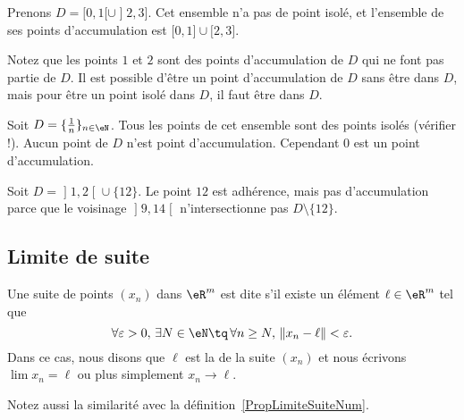 \begin{example}
	Prenons $D=\mathopen[ 0 , 1 [\cup\mathopen] 2 , 3 \mathclose]$. Cet ensemble n'a pas de point isolé, et l'ensemble de ses points d'accumulation est $\mathopen[ 0 , 1 \mathclose]\cup\mathopen[ 2,3  \mathclose]$.

	Notez que les points $1$ et $2$ sont des points d'accumulation de $D$ qui ne font pas partie de $D$. Il est possible d'être un point d'accumulation de $D$ sans être dans $D$, mais pour être un point isolé dans $D$, il faut être dans $D$.
\end{example}

\begin{example}
	Soit $D=\{ \frac{1}{ n }\}_{n\in\eN}$. Tous les points de cet ensemble sont des points isolés (vérifier !).  Aucun point de $D$ n'est point d'accumulation. Cependant $0$ est un point d'accumulation.
\end{example}

\begin{example}     \label{EXooWOYQooJolaTV}
    Soit \( D=\mathopen] 1 , 2 \mathclose[\cup\{ 12 \}\). Le point \( 12\) est adhérence, mais pas d'accumulation parce que le voisinage \( \mathopen] 9 , 14 \mathclose[\) n'intersectionne pas \( D\setminus \{ 12 \}\).
\end{example}

\subsection{Limite de suite}

\begin{definition}
	Une suite de points $(x_n)$ dans $\eR^m$ est dite  s'il existe un élément $\ell\in\eR^m$ tel que
	\begin{equation}	\label{EqCondLimSuite}
		\forall\varepsilon>0,\,\exists N\in \eN\tq\,\forall n\geq N,\,\| x_n-\ell \|<\varepsilon.
	\end{equation}
	Dans ce cas, nous disons que $\ell$ est la  de la suite $(x_n)$ et nous écrivons $\lim x_n=\ell$ ou plus simplement $x_n\to \ell$.
\end{definition}
Notez aussi la similarité avec la définition~\ref{PropLimiteSuiteNum}.

